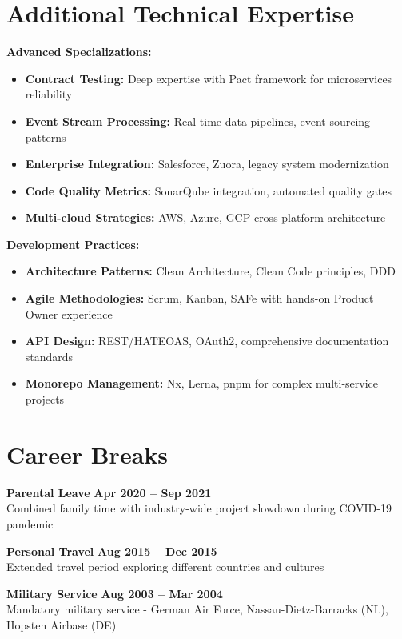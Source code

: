 \documentclass[11pt,a4paper]{article}
\begin{document}
\section{Additional Technical Expertise}

\textbf{Advanced Specializations:}
\begin{itemize}[leftmargin=*,noitemsep,topsep=0pt]
\item \textbf{Contract Testing:} Deep expertise with Pact framework for microservices reliability
\item \textbf{Event Stream Processing:} Real-time data pipelines, event sourcing patterns
\item \textbf{Enterprise Integration:} Salesforce, Zuora, legacy system modernization
\item \textbf{Code Quality Metrics:} SonarQube integration, automated quality gates
\item \textbf{Multi-cloud Strategies:} AWS, Azure, GCP cross-platform architecture
\end{itemize}

\textbf{Development Practices:}
\begin{itemize}[leftmargin=*,noitemsep,topsep=0pt]
\item \textbf{Architecture Patterns:} Clean Architecture, Clean Code principles, DDD
\item \textbf{Agile Methodologies:} Scrum, Kanban, SAFe with hands-on Product Owner experience
\item \textbf{API Design:} REST/HATEOAS, OAuth2, comprehensive documentation standards
\item \textbf{Monorepo Management:} Nx, Lerna, pnpm for complex multi-service projects
\end{itemize}

\section{Career Breaks}

\textbf{Parental Leave} \hfill \textbf{Apr 2020 -- Sep 2021}\\
Combined family time with industry-wide project slowdown during COVID-19 pandemic

\textbf{Personal Travel} \hfill \textbf{Aug 2015 -- Dec 2015}\\
Extended travel period exploring different countries and cultures

\textbf{Military Service} \hfill \textbf{Aug 2003 -- Mar 2004}\\
Mandatory military service - German Air Force, Nassau-Dietz-Barracks (NL), Hopsten Airbase (DE)
\end{document}
